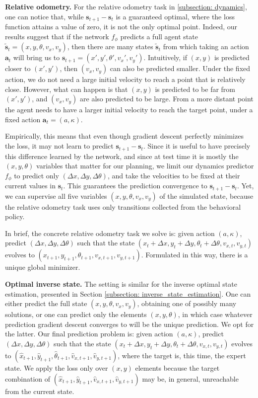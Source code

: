 \begin{appendices}
\textbf{Relative odometry.} For the relative odometry task in \ref{subsection: dynamics}, one can notice that, while $\mathbf{s}_{t+1} - \mathbf{s}_t$ is a guaranteed optimal, where the loss function attains a value of zero, it is not the only optimal point. Indeed, our results suggest that if the network $f_\phi$ predicts a full agent state $\tilde{\mathbf{s}}_t = (x, y, \theta, v_x, v_y)$, then there are many states $\tilde{\mathbf{s}}_t$ from which taking an action $\mathbf{a}_t$ will bring us to $\mathbf{s}_{t+1} = (x', y', \theta', v_x', v_y')$. Intuitively, if $(x, y)$ is predicted closer to $(x', y')$, then $(v_x, v_y)$ can also be predicted smaller. Under the fixed action, we do not need a large initial velocity to reach a point that is relatively close. However, what can happen is that $(x, y)$ is predicted to be far from $(x', y')$, and $(v_x, v_y)$ are also predicted to be large. From a more distant point the agent needs to have a larger initial velocity to reach the target point, under a fixed action $\mathbf{a}_t = (a, \kappa)$.

Empirically, this means that even though gradient descent perfectly minimizes the loss, it may not learn to predict $\mathbf{s}_{t+1} - \mathbf{s}_t$. Since it is useful to have precisely this difference learned by the network, and since at test time it is mostly the $(x, y, \theta)$ variables that matter for our planning, we limit our dynamics predictor $f_\phi$ to predict only $(\Delta x, \Delta y, \Delta \theta)$, and take the velocities to be fixed at their current values in $\mathbf{s}_t$. This guarantees the prediction convergence to $\mathbf{s}_{t+1} - \mathbf{s}_t$. Yet, we can supervise all five variables $(x, y, \theta, v_x, v_y)$ of the simulated state, because the relative odometry task uses only transitions collected from the behavioral policy.

In brief, the concrete relative odometry task we solve is: given action $(a, \kappa)$, predict $(\Delta x, \Delta y, \Delta \theta)$ such that the state $(x_t + \Delta x, y_t + \Delta y, \theta_t + \Delta \theta, v_{x,t}, v_{y,t})$ evolves to $(x_{t+1}, y_{t+1}, \theta_{t+1}, v_{x,t+1}, v_{y, t+1})$. Formulated in this way, there is a unique global minimizer.

\textbf{Optimal inverse state.} The setting is similar for the inverse optimal state estimation, presented in Section \ref{subsection: inverse_state_estimation}. One can either predict the full state $(x, y, \theta, v_x, v_y)$, obtaining one of possibly many solutions, or one can predict only the elements $(x, y, \theta)$, in which case whatever prediction gradient descent converges to will be the unique prediction. We opt for the latter. Our final prediction problem is: given action $(a, \kappa)$, predict $(\Delta x, \Delta y, \Delta \theta)$ such that the state $(x_t + \Delta x, y_t + \Delta y, \theta_t + \Delta \theta, v_{x,t}, v_{y,t})$ evolves to $(\hat{x}_{t+1}, \hat{y}_{t+1}, \hat{\theta}_{t+1}, \hat{v}_{x,t+1}, \hat{v}_{y, t+1})$, where the target is, this time, the expert state. We apply the loss only over $(x, y)$ elements because the target combination of $(\hat{x}_{t+1}, \hat{y}_{t+1}, \hat{v}_{x,t+1}, \hat{v}_{y,t+1})$ may be, in general, unreachable from the current state.


\end{appendices}
